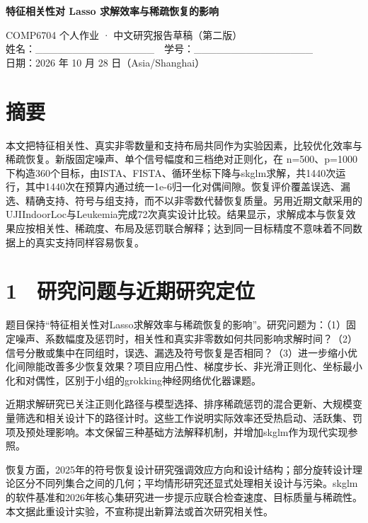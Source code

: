 \documentclass[UTF8,fontset=fandol,10pt]{ctexart}
\begin{document}
\begin{center}\Large\bfseries 特征相关性对 Lasso 求解效率与稀疏恢复的影响\end{center}
COMP6704 个人作业 · 中文研究报告草稿（第二版）\\ 姓名：\_\_\_\_\_\_\_\_\_\_\_\_\_\_\_\_　学号：\_\_\_\_\_\_\_\_\_\_\_\_\_\_\_\_\\ 日期：2026 年 10 月 28 日（Asia/Shanghai）

\section*{摘要}
本文把特征相关性、真实非零数量和支持布局共同作为实验因素，比较优化效率与稀疏恢复。新版固定噪声、单个信号幅度和三档绝对正则化，在 n=500、p=1000 下构造360个目标，由ISTA、FISTA、循环坐标下降与skglm求解，共1440次运行，其中1440次在预算内通过统一1e-6归一化对偶间隙。恢复评价覆盖误选、漏选、精确支持、符号与组支持，而不以非零数代替恢复质量。另用近期文献采用的UJIIndoorLoc与Leukemia完成72次真实设计比较。结果显示，求解成本与恢复效果应按相关性、稀疏度、布局及惩罚联合解释；达到同一目标精度不意味着不同数据上的真实支持同样容易恢复。

\section*{1　研究问题与近期研究定位}
题目保持“特征相关性对Lasso求解效率与稀疏恢复的影响”。研究问题为：（1）固定噪声、系数幅度及惩罚时，相关性和真实非零数如何共同影响求解时间？（2）信号分散或集中在同组时，误选、漏选及符号恢复是否相同？（3）进一步缩小优化间隙能改善多少恢复效果？项目应用凸性、梯度步长、非光滑正则化、坐标最小化和对偶性，区别于小组的grokking神经网络优化器课题。

近期求解研究已关注正则化路径与模型选择\cite{tay2023glmnet}、排序稀疏惩罚的混合更新\cite{larsson2023slope}、大规模变量筛选\cite{zogala2024screening}和相关设计下的路径计时\cite{yang2024adelie}。这些工作说明实际效率还受热启动、活跃集、罚项及预处理影响。本文保留三种基础方法解释机制，并增加skglm作为现代实现参照。

恢复方面，2025年的符号恢复设计研究强调效应方向和设计结构\cite{stallrich2025}；部分旋转设计理论区分不同列集合之间的几何\cite{buhai2025}；平均情形研究还显式处理相关设计与污染\cite{minsker2025}。skglm的软件基准\cite{moufad2025}和2026年核心集研究\cite{zou2026coreset}进一步提示应联合检查速度、目标质量与稀疏性。本文据此重设计实验，不宣称提出新算法或首次研究相关性。

\clearpage
\end{document}
